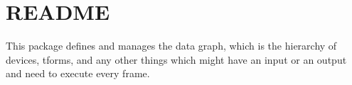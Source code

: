 \chapter{README}
\hypertarget{md_panda_2src_2dgraph_2README}{}\label{md_panda_2src_2dgraph_2README}
This package defines and manages the data graph, which is the hierarchy of devices, tforms, and any other things which might have an input or an output and need to execute every frame. 